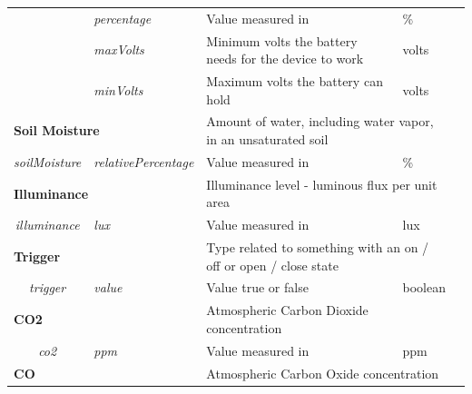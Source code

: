 \begin{landscape}
\begin{longtable}{cllll}
                                         & \textit{percentage}                & Value measured in                                      & \%                             &  \\
                                         & \textit{maxVolts}                  & Minimum volts the battery needs for the device to work & volts                          &  \\
                                         & \textit{minVolts}                  & Maximum volts the battery can hold                     & volts                          &  \\ \cline{1-4}
   \multicolumn{2}{l}{\textbf{Soil Moisture}}                                 & \multicolumn{2}{l}{Amount of water, including water vapor, in an unsaturated soil}      &  \\
   \textit{soilMoisture}                  & \textit{relativePercentage}        & Value measured in                                      & \%                             &  \\ \cline{1-4}
   \multicolumn{2}{l}{\textbf{Illuminance}}                                   & \multicolumn{2}{l}{Illuminance level - luminous flux per unit area}                     &  \\
   \textit{illuminance}                  & \textit{lux}                       & Value measured in                                      & lux                            &  \\ \cline{1-4}
   \multicolumn{2}{l}{\textbf{Trigger}}                                       & \multicolumn{2}{l}{Type related to something with an on / off or open / close state}    &  \\
   \textit{trigger}                      & \textit{value}                     & Value true or false                                    & boolean                        &  \\ \cline{1-4}
   \multicolumn{2}{l}{\textbf{CO2}}                                           & \multicolumn{2}{l}{Atmospheric Carbon Dioxide concentration}                            &  \\
   \textit{co2}                          & \textit{ppm}                       & Value measured in                                      & ppm                            &  \\ \cline{1-4}
   \multicolumn{2}{l}{\textbf{CO}}                                            & \multicolumn{2}{l}{Atmospheric Carbon Oxide concentration}                              &  \\

\end{longtable}
\end{landscape}
